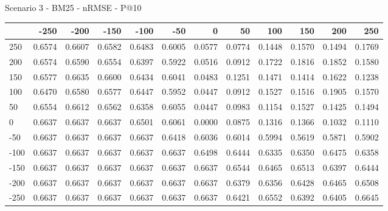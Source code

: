 Scenario 3 - BM25 - nRMSE - P@10
\begin{tabular}{lrrrrrrrrrrr}
\toprule
{} &   -250 &   -200 &   -150 &   -100 &   -50  &    0   &    50  &    100 &    150 &    200 &    250 \\
\midrule
 250 & 0.6574 & 0.6607 & 0.6582 & 0.6483 & 0.6005 & 0.0577 & 0.0774 & 0.1448 & 0.1570 & 0.1494 & 0.1769 \\
 200 & 0.6574 & 0.6590 & 0.6554 & 0.6397 & 0.5922 & 0.0516 & 0.0912 & 0.1722 & 0.1816 & 0.1852 & 0.1580 \\
 150 & 0.6577 & 0.6635 & 0.6600 & 0.6434 & 0.6041 & 0.0483 & 0.1251 & 0.1471 & 0.1414 & 0.1622 & 0.1238 \\
 100 & 0.6470 & 0.6580 & 0.6577 & 0.6447 & 0.5952 & 0.0447 & 0.0912 & 0.1527 & 0.1516 & 0.1905 & 0.1570 \\
 50  & 0.6554 & 0.6612 & 0.6562 & 0.6358 & 0.6055 & 0.0447 & 0.0983 & 0.1154 & 0.1527 & 0.1425 & 0.1494 \\
 0   & 0.6637 & 0.6637 & 0.6637 & 0.6501 & 0.6061 & 0.0000 & 0.0875 & 0.1316 & 0.1366 & 0.1032 & 0.1110 \\
-50  & 0.6637 & 0.6637 & 0.6637 & 0.6637 & 0.6418 & 0.6036 & 0.6014 & 0.5994 & 0.5619 & 0.5871 & 0.5902 \\
-100 & 0.6637 & 0.6637 & 0.6637 & 0.6637 & 0.6637 & 0.6498 & 0.6444 & 0.6335 & 0.6350 & 0.6475 & 0.6358 \\
-150 & 0.6637 & 0.6637 & 0.6637 & 0.6637 & 0.6637 & 0.6637 & 0.6544 & 0.6465 & 0.6513 & 0.6397 & 0.6444 \\
-200 & 0.6637 & 0.6637 & 0.6637 & 0.6637 & 0.6637 & 0.6637 & 0.6379 & 0.6356 & 0.6428 & 0.6465 & 0.6508 \\
-250 & 0.6637 & 0.6637 & 0.6637 & 0.6637 & 0.6637 & 0.6637 & 0.6421 & 0.6552 & 0.6392 & 0.6405 & 0.6645 \\
\bottomrule
\end{tabular}

